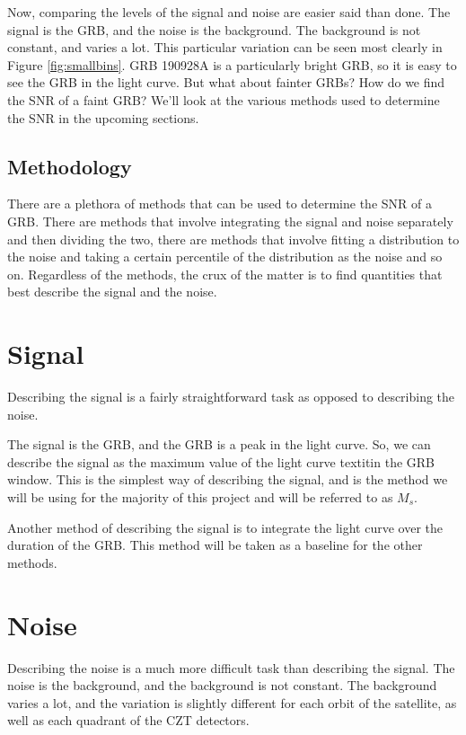 \documentclass[11pt]{book} %
\begin{document}
Now, comparing the levels of the signal and noise are easier said than done. The signal is the GRB, and the noise is the background. The background is not constant, and varies a lot. This particular variation can be seen most clearly in Figure \ref{fig:smallbins}. GRB 190928A is a particularly bright GRB, so it is easy to see the GRB in the light curve. But what about fainter GRBs? How do we find the SNR of a faint GRB? We'll look at the various methods used to determine the SNR in the upcoming sections.


\subsection{Methodology}
There are a plethora of methods that can be used to determine the SNR of a GRB. There are methods that involve integrating the signal and noise separately and then dividing the two, there are methods that involve fitting a distribution to the noise and taking a certain percentile of the distribution as the noise and so on. Regardless of the methods, the crux of the matter is to find quantities that best describe the signal and the noise.

\newpage

\section{Signal}

Describing the signal is a fairly straightforward task as opposed to describing the noise.

The signal is the GRB, and the GRB is a peak in the light curve. So, we can describe the signal as the maximum value of the light curve textit{in the GRB window}. This is the simplest way of describing the signal, and is the method we will be using for the majority of this project and will be referred to as \textbf{$M_s$}.

Another method of describing the signal is to integrate the light curve over the duration of the GRB. This method will be taken as a baseline for the other methods.

\section{Noise}

Describing the noise is a much more difficult task than describing the signal. The noise is the background, and the background is not constant. The background varies a lot, and the variation is slightly different for each orbit of the satellite, as well as each quadrant of the CZT detectors.
\end{document}
